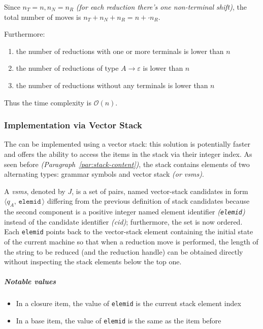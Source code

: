 \documentclass[english]{article}
\begin{document}
Since \(n_T = n, n_N=n_R\) \textit{(for each reduction there's one non-terminal shift)}, the total number of moves is \(n_T + n_N + n_R = n +  \cdot n_R\).

Furthermore:
\begin{enumerate}
  \item the number of reductions with one or more terminals is lower than \(n\)
  \item the number of reductions of type \(A \rightarrow \varepsilon\) is lower than \(n\)
  \item the number of reductions without any terminals is lower than \(n\)
\end{enumerate}

Thus the time complexity is \(\mathcal{O}(n)\).

\subsubsection{Implementation via Vector Stack}

The \PDA can be implemented using a vector stack: this solution is potentially faster and offers the ability to access the items in the stack via their integer index.
As seen before \textit{(Paragraph~\ref{par:stack-content})}, the stack contains elements of two alternating types: grammar symbols and vector stack \mstates \textit{(or vsms)}.

A \textit{vsms}, denoted by \(J\), is a set of pairs, named vector-stack candidates in form \(\langle q_A, \, \texttt{elemid} \, \rangle\) differing from the previous definition of stack candidates because the second component is a positive integer named element identifier \textit{(\texttt{elemid})} instead of the candidate identifier \textit{(cid)};
furthermore, the set is now ordered.
Each \texttt{elemid} points back to the vector-stack element containing the initial state of the current machine so that when a reduction move is performed, the length of the string to be reduced (and the reduction handle) can be obtained directly without inspecting the stack elements below the top one.

\subparagraph*{Notable values}

\begin{itemize}
  \item In a closure item, the value of \texttt{elemid} is the current stack element index
  \item In a base item, the value of \texttt{elemid} is the same as the item before
\end{itemize}
\end{document}

